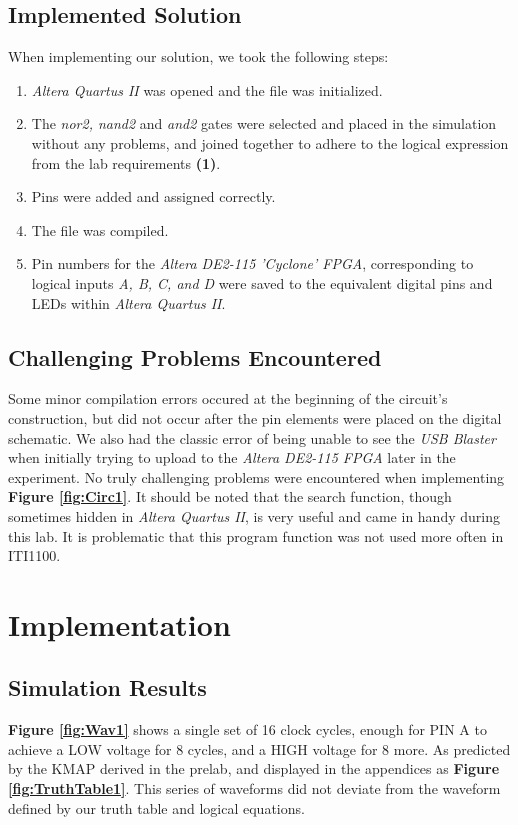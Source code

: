\documentclass[a4paper,12pt]{article}
\begin{document}
\subsection{Implemented Solution}
When implementing our solution, we took the following steps:
\begin{enumerate}
\item \textit{Altera Quartus II} was opened and the file was initialized.
\item The \textit{nor2, nand2} and \textit{and2} gates were selected and placed in the simulation without any problems, and joined together to adhere to the logical expression from the lab requirements \textbf{(1)}.
\item Pins were added and assigned correctly.
\item The file was compiled.
\item Pin numbers for the \textit{Altera DE2-115 'Cyclone' FPGA}, corresponding to logical inputs \textit{A, B, C, and D} were saved to the equivalent digital pins and LEDs within \textit{Altera Quartus II}.
\end{enumerate}
\subsection{Challenging Problems Encountered}

Some minor compilation errors occured at the beginning of the circuit's construction, but did not occur after the pin elements were placed on the digital schematic. We also had the classic error of being unable to see the \textit{USB Blaster} when initially trying to upload to the \textit{Altera DE2-115 FPGA} later in the experiment. No truly challenging problems were encountered when implementing \textbf{Figure \ref{fig:Circ1}}. It should be noted that the search function, though sometimes hidden in \textit{Altera Quartus II}, is very useful and came in handy during this lab. It is problematic that this program function was not used more often in ITI1100.





\section{Implementation}

\subsection{Simulation Results}
\textbf{Figure \ref{fig:Wav1}} shows a single set of 16 clock cycles, enough for PIN A to achieve a LOW voltage for 8 cycles, and a HIGH voltage for 8 more. As predicted by the KMAP derived in the prelab, and displayed in the appendices as \textbf{Figure \ref{fig:TruthTable1}}. This series of waveforms did not deviate from the waveform defined by our truth table and logical equations. 
\end{document}
